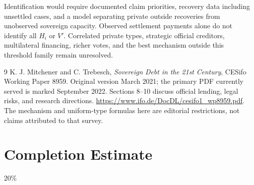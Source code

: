 \documentclass[11pt,a4paper]{article}
\theoremstyle{remark}
\begin{document}
Identification would require documented claim priorities, recovery data including unsettled cases, and a model separating private outside recoveries from unobserved sovereign capacity. Observed settlement payments alone do not identify all $H_i$ or $V'$. Correlated private types, strategic official creditors, multilateral financing, richer votes, and the best mechanism outside this threshold family remain unresolved.

\begin{thebibliography}{9}
 K. J. Mitchener and C. Trebesch, \emph{Sovereign Debt in the 21st Century}, CESifo Working Paper 8959. Original version March 2021; the primary PDF currently served is marked September 2022. Sections 8--10 discuss official lending, legal risks, and research directions. \url{https://www.ifo.de/DocDL/cesifo1_wp8959.pdf}. The mechanism and uniform-type formulas here are editorial restrictions, not claims attributed to that survey.
\end{thebibliography}

\section{Completion Estimate}
20\%
\end{document}
